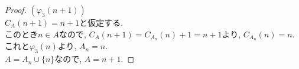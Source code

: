 \begin{proof}
 $(\varphi_3(n+1))$\\
 $C_{A}(n+1)=n+1$と仮定する.\\
 このとき$n \in A$なので,
 $C_A(n+1) = C_{A_n}(n) + 1 = n + 1$より,
 $C_{A_n}(n) = n$.\\
 これと$\varphi_3(n)$より,
 $A_n = n$.\\
 $A = A_n \cup \{n\}$なので,
 $A = n+1$.
\end{proof}
